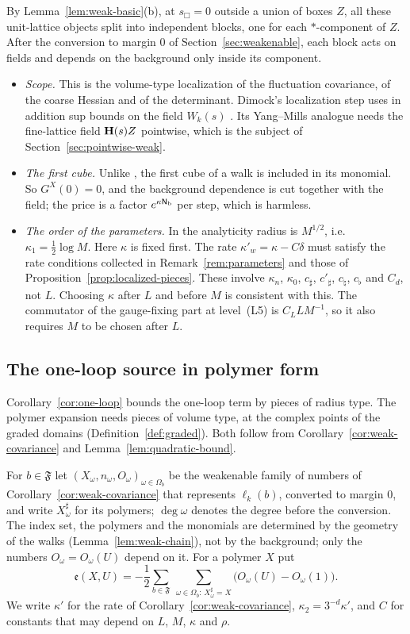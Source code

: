 By Lemma~\ref{lem:weak-basic}(b), at $s_\Box=0$ outside a union of boxes $Z$, all these unit-lattice objects split into independent blocks, one for each $*$-component of $Z$. After the conversion to margin $0$ of Section~\ref{sec:weakenable}, each block acts on fields and depends on the background only inside its component.
\begin{itemize}
\item \emph{Scope.} This is the volume-type localization of the fluctuation covariance, of the coarse Hessian and of the determinant. Dimock's localization step \cite[(225)--(233)]{DimockI} uses in addition sup bounds on the field $W_k(s)$ \cite[Lemma~16, (100)]{DimockI}. Its Yang--Mills analogue needs the fine-lattice field $\mathbf H(s)Z$ pointwise, which is the subject of Section~\ref{sec:pointwise-weak}.
\item \emph{The first cube.} Unlike \cite[(102)]{DimockI}, the first cube of a walk is included in its monomial. So $G^X(0)=0$, and the background dependence is cut together with the field; the price is a factor $e^{\kappa\mathsf N_{\rm b}}$ per step, which is harmless.
\item \emph{The order of the parameters.} In \cite{DimockI} the analyticity radius is $M^{1/2}$, i.e.\ $\kappa_1=\frac12\log M$. Here $\kappa$ is fixed first. The rate $\kappa'_w=\kappa-C\delta$ must satisfy the rate conditions collected in Remark~\ref{rem:parameters} and those of Proposition~\ref{prop:localized-pieces}. These involve $\kappa_n$, $\kappa_0$, $c_\sharp$, $c'_\sharp$, $c_\natural$, $c_\flat$ and $C_d$, not $L$. Choosing $\kappa$ after $L$ and before $M$ is consistent with this. The commutator of the gauge-fixing part at level~(L5) is $C_LLM^{-1}$, so it also requires $M$ to be chosen after $L$.
\end{itemize}

\subsection{The one-loop source in polymer form}\label{sec:one-loop-polymer}

Corollary~\ref{cor:one-loop} bounds the one-loop term by pieces of radius type. The polymer expansion needs pieces of volume type, at the complex points of the graded domains (Definition~\ref{def:graded}). Both follow from Corollary~\ref{cor:weak-covariance} and Lemma~\ref{lem:quadratic-bound}.

For $b\in\mathfrak F$ let $(X_\omega,n_\omega,O_\omega)_{\omega\in\Omega_b}$ be the weakenable family of numbers of Corollary~\ref{cor:weak-covariance} that represents $\ell_k(b)$, converted to margin $0$, and write $X^\sharp_\omega$ for its polymers; $\deg\omega$ denotes the degree before the conversion. The index set, the polymers and the monomials are determined by the geometry of the walks (Lemma~\ref{lem:weak-chain}), not by the background; only the numbers $O_\omega=O_\omega(U)$ depend on it. For a polymer $X$ put
\[
\mathfrak e(X,U)=-\frac12\sum_{b\in\mathfrak F}\ \sum_{\omega\in\Omega_b:\,X^\sharp_\omega=X}\big(O_\omega(U)-O_\omega(1)\big).
\]
We write $\kappa'$ for the rate of Corollary~\ref{cor:weak-covariance}, $\kappa_2=3^{-d}\kappa'$, and $C$ for constants that may depend on $L$, $M$, $\kappa$ and $\rho$.

